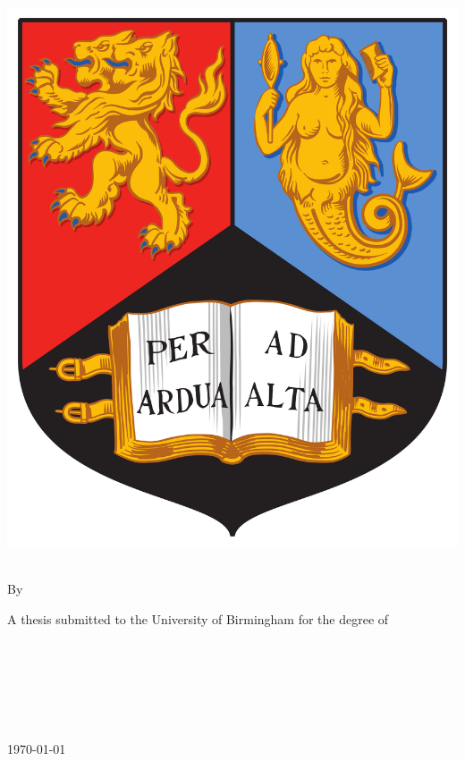 \begin{titlepage}
\begin{center}

\includegraphics[width=0.2\columnwidth]{figures/logo.png} %
\vspace*{.06\textheight}

{\LARGE \textsc{\tttitle}\par}\vspace{0.4cm} %
\HRule \\[1.5cm] %
 
By\\[\baselineskip]
\textsc{\Large{\authorname}}
 
\vspace*{\fill}

\large A thesis submitted to the University of Birmingham for the degree of\\ \textsc{\degreename}\\[2cm]

\begin{flushright} \normalsize
	\groupname
	\\
	\deptname
	\\
	\facname
	\\
	\univname
	\\
\vfill

{\today}\\[2cm] %
\end{flushright}
 
\end{center}
\end{titlepage}